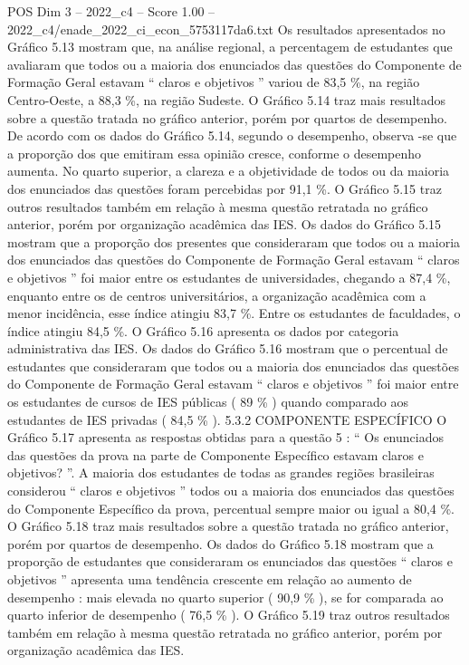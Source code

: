 \begin{textsample}{POS Dim 3 – 2022\_c4 – Score 1.00 – 2022\_c4/enade\_2022\_ci\_econ\_5753117da6.txt}
Os resultados apresentados no Gráfico 5.13 mostram que, na análise regional, a percentagem de estudantes que avaliaram que todos ou a maioria dos enunciados das questões do Componente de Formação Geral estavam “ claros e objetivos ” variou de 83,5 \%, na região Centro-Oeste, a 88,3 \%, na região Sudeste.
O Gráfico 5.14 traz mais resultados sobre a questão tratada no gráfico anterior, porém por quartos de desempenho.
De acordo com os dados do Gráfico 5.14, segundo o desempenho, observa -se que a proporção dos que emitiram essa opinião cresce, conforme o desempenho aumenta.
No quarto superior, a clareza e a objetividade de todos ou da maioria dos enunciados das questões foram percebidas por 91,1 \%.
O Gráfico 5.15 traz outros resultados também em relação à mesma questão retratada no gráfico anterior, porém por organização acadêmica das IES.
Os dados do Gráfico 5.15 mostram que a proporção dos presentes que consideraram que todos ou a maioria dos enunciados das questões do Componente de Formação Geral estavam “ claros e objetivos ” foi maior entre os estudantes de universidades, chegando a 87,4 \%, enquanto entre os de centros universitários, a organização acadêmica com a menor incidência, esse índice atingiu 83,7 \%.
Entre os estudantes de faculdades, o índice atingiu 84,5 \%.
O Gráfico 5.16 apresenta os dados por categoria administrativa das IES.
Os dados do Gráfico 5.16 mostram que o percentual de estudantes que consideraram que todos ou a maioria dos enunciados das questões do Componente de Formação Geral estavam “ claros e objetivos ” foi maior entre os estudantes de cursos de IES públicas ( 89 \% ) quando comparado aos estudantes de IES privadas ( 84,5 \% ). 5.3.2 COMPONENTE ESPECÍFICO O Gráfico 5.17 apresenta as respostas obtidas para a questão 5 : “ Os enunciados das questões da prova na parte de Componente Específico estavam claros e objetivos? ”.
A maioria dos estudantes de todas as grandes regiões brasileiras considerou “ claros e objetivos ” todos ou a maioria dos enunciados das questões do Componente Específico da prova, percentual sempre maior ou igual a 80,4 \%.
O Gráfico 5.18 traz mais resultados sobre a questão tratada no gráfico anterior, porém por quartos de desempenho.
Os dados do Gráfico 5.18 mostram que a proporção de estudantes que consideraram os enunciados das questões “ claros e objetivos ” apresenta uma tendência crescente em relação ao aumento de desempenho : mais elevada no quarto superior ( 90,9 \% ), se for comparada ao quarto inferior de desempenho ( 76,5 \% ).
O Gráfico 5.19 traz outros resultados também em relação à mesma questão retratada no gráfico anterior, porém por organização acadêmica das IES.

\end{textsample}
